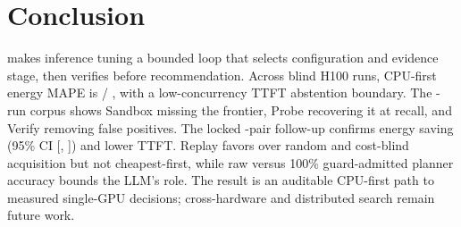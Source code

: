 \section{Conclusion}

\system{} makes inference tuning a bounded loop that selects configuration and
evidence stage, then verifies before recommendation.  Across
\BlindMeasurements{} blind H100 runs, CPU-first energy MAPE is \CalibratedEnergyMAPE{}/
\ConfirmationEnergyMAPE{}, with a low-concurrency TTFT abstention boundary.
The \ConfigurationMeasuredRuns{}-run corpus shows Sandbox missing the frontier,
Probe recovering it at \LoneParetoRecall{} recall, and Verify removing false
positives.  The locked \WinnerConfirmationPairs{}-pair follow-up confirms
\WinnerEnergySaving{} energy saving (95\% CI [\WinnerEnergyCILower{},
\WinnerEnergyCIUpper{}]) and \WinnerTTFTReduction{} lower TTFT.  Replay favors
\ipig{} over random and cost-blind acquisition but not cheapest-first, while
\PlannerVtwoRaw{} raw versus 100\% guard-admitted planner accuracy bounds the
LLM's role.  The result is an auditable CPU-first path to measured single-GPU
decisions; cross-hardware and distributed search remain future work.
